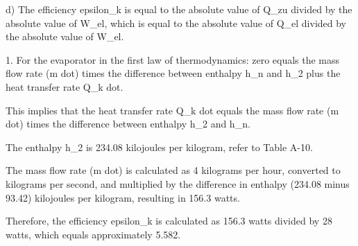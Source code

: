 d) The efficiency epsilon_k is equal to the absolute value of Q_zu divided by the absolute value of W_el, which is equal to the absolute value of Q_el divided by the absolute value of W_el.

1. For the evaporator in the first law of thermodynamics: zero equals the mass flow rate (m dot) times the difference between enthalpy h_n and h_2 plus the heat transfer rate Q_k dot.

This implies that the heat transfer rate Q_k dot equals the mass flow rate (m dot) times the difference between enthalpy h_2 and h_n.

The enthalpy h_2 is 234.08 kilojoules per kilogram, refer to Table A-10.

The mass flow rate (m dot) is calculated as 4 kilograms per hour, converted to kilograms per second, and multiplied by the difference in enthalpy (234.08 minus 93.42) kilojoules per kilogram, resulting in 156.3 watts.

Therefore, the efficiency epsilon_k is calculated as 156.3 watts divided by 28 watts, which equals approximately 5.582.